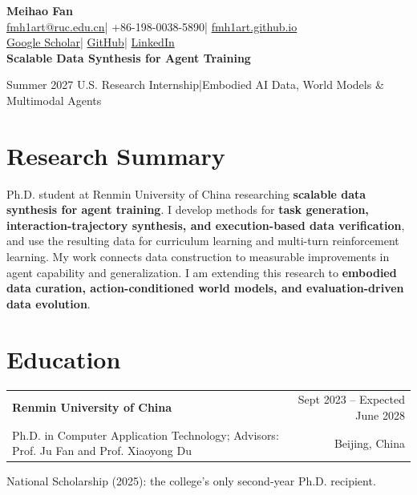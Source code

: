 \documentclass[a4paper,10pt]{article}
\makeatletter
\newcommand{\entry}[4]{%
  \needspace{3\baselineskip}
  \begin{tabularx}{\linewidth}{@{}Xr@{}}
  \textbf{#1} & {\small #2}\\
  {\small #3} & {\small\color{muted}#4}
  \end{tabularx}\par
}
\makeatother
\begin{document}
\fontsize{10}{11.8}\selectfont

\begin{center}
  {\fontsize{25}{28}\selectfont\bfseries\color{navy}Meihao Fan}\\[3pt]
  \href{mailto:fmh1art@ruc.edu.cn}{fmh1art@ruc.edu.cn}\quad|\quad
  +86-198-0038-5890\quad|\quad
  \href{https://fmh1art.github.io}{fmh1art.github.io}\\[2pt]
  \href{https://scholar.google.com/citations?user=BK058ZoAAAAJ}{Google Scholar}\quad|\quad
  \href{https://github.com/fmh1art}{GitHub}\quad|\quad
  \href{https://www.linkedin.com/in/meihao-fan-49b984422}{LinkedIn}\\[4pt]
  {\small\bfseries Scalable Data Synthesis for Agent Training}\par
  {\small Summer 2027 U.S. Research Internship\quad|\quad Embodied AI Data, World Models \& Multimodal Agents}
\end{center}

\vspace{-5pt}

\section{Research Summary}

Ph.D. student at Renmin University of China researching
\textbf{scalable data synthesis for agent training}.
I develop methods for \textbf{task generation, interaction-trajectory synthesis, and execution-based data verification},
and use the resulting data for curriculum learning and multi-turn reinforcement learning.
My work connects data construction to measurable improvements in agent capability and generalization.
I am extending this research to \textbf{embodied data curation, action-conditioned world models, and evaluation-driven data evolution}.

\section{Education}

\entry{Renmin University of China}{Sept 2023 -- Expected June 2028}
{Ph.D. in Computer Application Technology; Advisors: Prof. Ju Fan and Prof. Xiaoyong Du}
{Beijing, China}

{\small National Scholarship (2025): the college's only second-year Ph.D. recipient.}
\par\vspace{3pt}
\end{document}
